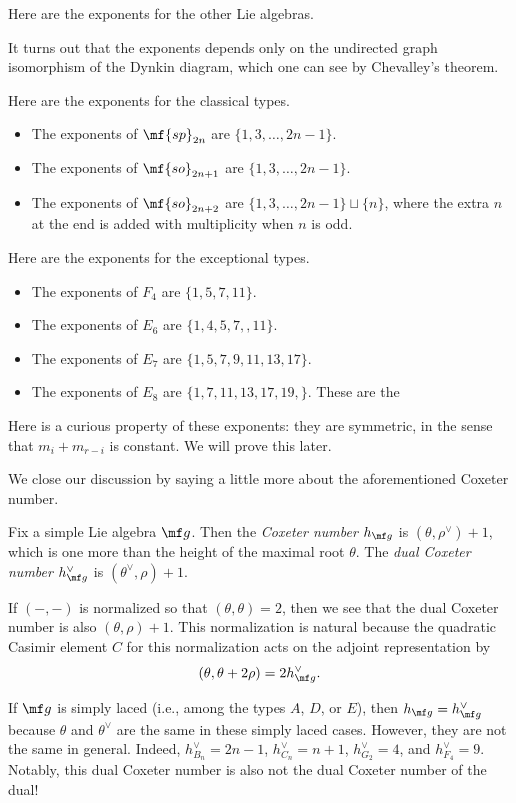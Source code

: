 \documentclass[../notes.tex]{subfiles}
\begin{document}
Here are the exponents for the other Lie algebras.
\begin{remark}
	It turns out that the exponents depends only on the undirected graph isomorphism of the Dynkin diagram, which one can see by Chevalley's theorem.
\end{remark}
\begin{example}
	Here are the exponents for the classical types.
	\begin{itemize}
		\item The exponents of $\mf{sp}_{2n}$ are $\{1,3,\ldots,2n-1\}$.
		\item The exponents of $\mf{so}_{2n+1}$ are $\{1,3,\ldots,2n-1\}$.
		\item The exponents of $\mf{so}_{2n+2}$ are $\{1,3,\ldots,2n-1\}\sqcup\{n\}$, where the extra $n$ at the end is added with multiplicity when $n$ is odd.
	\end{itemize}
\end{example}
\begin{example}
	Here are the exponents for the exceptional types.
	\begin{itemize}
		\item The exponents of $F_4$ are $\{1,5,7,11\}$.
		\item The exponents of $E_6$ are $\{1,4,5,7,,11\}$.
		\item The exponents of $E_7$ are $\{1,5,7,9,11,13,17\}$.
		\item The exponents of $E_8$ are $\{1,7,11,13,17,19,\}$. These are the 
	\end{itemize}
\end{example}
\begin{remark}
	Here is a curious property of these exponents: they are symmetric, in the sense that $m_i+m_{r-i}$ is constant. We will prove this later.
\end{remark}
We close our discussion by saying a little more about the aforementioned Coxeter number.
\begin{definition}
	Fix a simple Lie algebra $\mf g$. Then the \textit{Coxeter number} $h_{\mf g}$ is $(\theta,\rho^\lor)+1$, which is one more than the height of the maximal root $\theta$. The \textit{dual Coxeter number} $h_{\mf g}^\lor$ is $(\theta^\lor,\rho)+1$.
\end{definition}
\begin{remark}
	If $(-,-)$ is normalized so that $(\theta,\theta)=2$, then we see that the dual Coxeter number is also $(\theta,\rho)+1$. This normalization is natural because the quadratic Casimir element $C$ for this normalization acts on the adjoint representation by
	\[(\theta,\theta+2\rho)=2h_{\mf g}^\lor.\]
\end{remark}
\begin{remark}
	If $\mf g$ is simply laced (i.e., among the types $A$, $D$, or $E$), then $h_{\mf g}=h_{\mf g}^\lor$ because $\theta$ and $\theta^\lor$ are the same in these simply laced cases. However, they are not the same in general. Indeed, $h^\lor_{B_n}=2n-1$, $h^\lor_{C_n}=n+1$, $h^\lor_{G_2}=4$, and $h^\lor_{F_4}=9$. Notably, this dual Coxeter number is also not the dual Coxeter number of the dual!
\end{remark}
\end{document}
